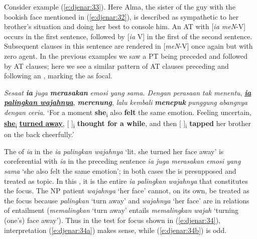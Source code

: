 \documentclass[output=paper
,modfonts
,nonflat]{langsci/langscibook}
\begin{document}
Consider example (\ref{e:djenar:33}). Here Alma, the sister of the guy with the bookish face mentioned in (\ref{e:djenar:32}), is described as sympathetic to her brother’s situation and doing her best to console him. An AT  with  [\textit{ia meN}-V] occurs in the first sentence, followed by [\textit{ia} V]   in the first  of the second sentence. Subsequent clauses in this sentence are rendered in [\textit{meN}-V] once again but with zero agent. In the previous examples we saw a PT  being preceded and followed by AT clauses; here we see a similar pattern of AT clauses preceding and following an  , marking the   as focal.

\begin{exe}
	\ex\label{e:djenar:33}
	\textit{Sesaat} \textbf{\textit{ia}} \textit{juga} \textbf{\textit{merasakan}} \textit{emosi yang sama. Dengan perasaan tak menentu}, \uline{\textbf{\textit{ia}}} \uline{\textbf{\textit{palingkan wajahnya}}}, \textbf{\textit{merenung}}, \textit{lalu kembali} \textbf{\textit{menepuk}} \textit{punggung abangnya dengan ceria}.
	\glt ‘For a moment \textbf{she}\textsubscript{i} also \textbf{felt} the same emotion. Feeling uncertain, \uline{\textbf{she}\textsubscript{i}} \uline{\textbf{turned} \textbf{away}}, [ ]\textsubscript{i} \textbf{thought for a while}, and then [ ]\textsubscript{i} \textbf{tapped} her brother on the back cheerfully.’ \hfill 
	\mbox{\citep[9]{Karina2008}}
\end{exe}

\noindent
The  of \textit{ia} in the   \textit{ia palingkan wajahnya} ‘lit. she turned her face away’ is coreferential with \textit{ia} in the preceding sentence \textit{ia juga merasakan emosi yang sama} ‘she also felt the same emotion’; in both cases the  is presupposed and treated as topic. In this , it is the entire  \textit{ia} \textit{palingkan wajahnya} that constitutes the focus. The NP patient \textit{wajahnya} ‘her face’ cannot, on its own, be treated as the focus because \textit{palingkan} ‘turn away’ and \textit{wajahnya} ‘her face’ are in relations of entailment (\textit{memalingkan} ‘turn away’ entails \textit{memalingkan} \textit{wajah} ‘turning (one’s) face away’). Thus in the test for focus shown in (\ref{e:djenar:34}), interpretation (\ref{e:djenar:34a}) makes sense, while (\ref{e:djenar:34b}) is odd. 
\end{document}

